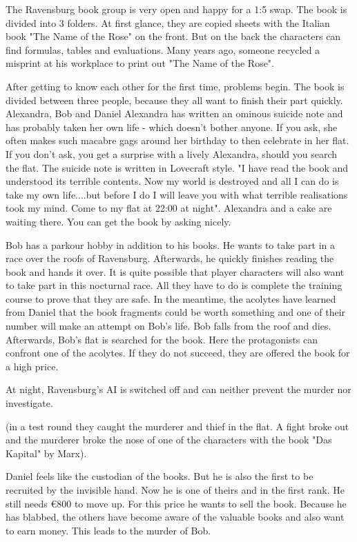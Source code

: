 The Ravensburg book group is very open and happy for a 1:5 swap. The book is divided into 3 folders. At first glance, they are copied sheets with the Italian book "The Name of the Rose" on the front. But on the back the characters can find formulas, tables and evaluations. Many years ago, someone recycled a misprint at his workplace to print out "The Name of the Rose".

After getting to know each other for the first time, problems begin. The book is divided between three people, because they all want to finish their part quickly. Alexandra, Bob and Daniel
Alexandra has written an ominous suicide note and has probably taken her own life - which doesn't bother anyone. If you ask, she often makes such macabre gags around her birthday to then celebrate in her flat. If you don't ask, you get a surprise with a lively Alexandra, should you search the flat.
The suicide note is written in Lovecraft style. "I have read the book and understood its terrible contents. Now my world is destroyed and all I can do is take my own life....but before I do I will leave you with what terrible realisations took my mind. Come to my flat at 22:00 at night".
Alexandra and a cake are waiting there. You can get the book by asking nicely.

Bob has a parkour hobby in addition to his books.  He wants to take part in a race over the roofs of Ravensburg. Afterwards, he quickly finishes reading the book and hands it over. It is quite possible that player characters will also want to take part in this nocturnal race. All they have to do is complete the training course to prove that they are safe.
In the meantime, the acolytes have learned from Daniel that the book fragments could be worth something and one of their number will make an attempt on Bob's life. Bob falls from the roof and dies. Afterwards, Bob's flat is searched for the book.
Here the protagonists can confront one of the acolytes. If they do not succeed, they are offered the book for a high price.

At night, Ravensburg's AI is switched off and can neither prevent the murder nor investigate.

(in a test round they caught the murderer and thief in the flat. A fight broke out and the murderer broke the nose of one of the characters with the book "Das Kapital" by Marx).

Daniel feels like the custodian of the books.  But he is also the first to be recruited by the invisible hand. Now he is one of theirs and in the first rank. He still needs €800 to move up. For this price he wants to sell the book. Because he has blabbed, the others have become aware of the valuable books and also want to earn money. This leads to the murder of Bob.


